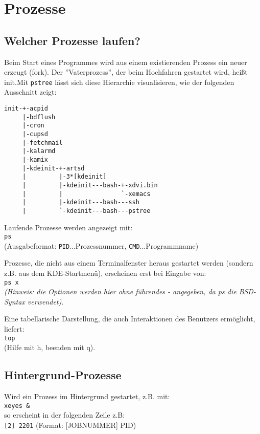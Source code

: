 \documentclass[11pt]{article}
\begin{document}
\section{Prozesse}
\subsection{Welcher Prozesse laufen?}
Beim Start eines Programmes wird aus einem existierenden Prozess ein
neuer erzeugt (fork). Der ''Vaterprozess'', der beim Hochfahren
gestartet wird, heißt init.Mit \texttt{pstree} lässt sich diese
Hierarchie visualisieren, wie der folgenden Ausschnitt zeigt:
\begin{samepage}
\begin{verbatim}
init-+-acpid
     |-bdflush
     |-cron
     |-cupsd
     |-fetchmail
     |-kalarmd
     |-kamix
     |-kdeinit-+-artsd
     |         |-3*[kdeinit]
     |         |-kdeinit---bash-+-xdvi.bin
     |         |                `-xemacs
     |         |-kdeinit---bash---ssh
     |         `-kdeinit---bash---pstree
\end{verbatim}
\end{samepage}

Laufende Prozesse werden angezeigt mit:\\
\texttt{ps}\\
(Ausgabeformat: \texttt{PID}...Prozessnummer, \texttt{CMD}...Programmname)

Prozesse, die nicht aus einem Terminalfenster heraus gestartet werden
(sondern z.B. aus dem KDE-Startmenü), erscheinen erst bei Eingabe von:\\
\texttt{ps x}\\
\textit{(Hinweis: die Optionen werden hier ohne führendes - angegeben,
  da ps die BSD-Syntax verwendet)}.

Eine tabellarische Darstellung, die auch Interaktionen des Benutzers
ermöglicht, liefert:\\
\texttt{top}\\
(Hilfe mit h, beenden mit q).


\subsection{Hintergrund-Prozesse}
Wird ein Prozess im Hintergrund gestartet, z.B. mit:\\
\texttt{xeyes \&} \\
so erscheint in der folgenden Zeile z.B: \\
\texttt{[2] 2201} (Format: [JOBNUMMER] PID)
\end{document}
